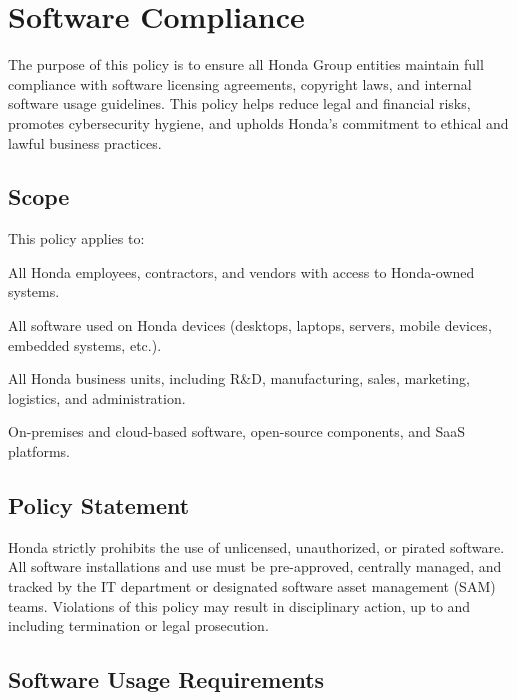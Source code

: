 \chapter{Software Compliance}
\pagestyle{fancy}

\fancyhf{}

\fancyfoot[C]{\thepage}

\renewcommand{\headrulewidth}{0pt}
\renewcommand{\footrulewidth}{0pt}


The purpose of this policy is to ensure all Honda Group entities maintain full compliance with software licensing agreements, copyright laws, and internal software usage guidelines. This policy helps reduce legal and financial risks, promotes cybersecurity hygiene, and upholds Honda’s commitment to ethical and lawful 
business practices. 

\section{Scope}

This policy applies to:

All Honda employees, contractors, and vendors with access to Honda-owned systems.

All software used on Honda devices (desktops, laptops, servers, mobile devices, embedded systems, etc.).

All Honda business units, including R&D, manufacturing, sales, marketing, logistics, and administration.

On-premises and cloud-based software, open-source components, and SaaS platforms.

\section{Policy Statement}

Honda strictly prohibits the use of unlicensed, unauthorized, or pirated software. All software installations and use must be pre-approved, centrally managed, and tracked by the IT department or designated software asset management (SAM) teams. Violations of this policy may result in disciplinary action, up to and including termination or legal prosecution.

\section{Software Usage Requirements}

